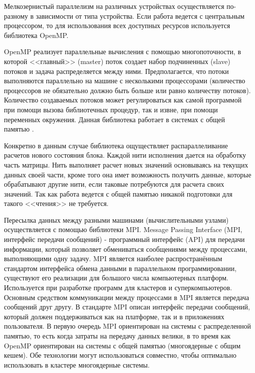 \documentclass[a4paper, 14pt]{article}
\theoremstyle{definition}
\begin{document}
\par Мелкозернистый параллелизм на различных устройствах осуществляется по-разному в зависимости от типа устройства. Если работа ведется с центральным процессором, то для использования всех доступных ресурсов используется библиотека OpenMP.

\par OpenMP реализует параллельные вычисления с помощью многопоточности, в которой <<главный>> (master) поток создает набор подчиненных (slave) потоков и задача распределяется между ними. Предполагается, что потоки выполняются параллельно на машине с несколькими процессорами (количество процессоров не обязательно должно быть больше или равно количеству потоков). Количество создаваемых потоков может регулироваться как самой программой при помощи вызова библиотечных процедур, так и извне, при помощи переменных окружения. Данная библиотека работает в системах с общей памятью .

\par Конкретно в данным случае библиотека ощуществляет распараллеливание расчетов нового состояния блока. Каждой нити исполнения дается на обработку часть матрицы. Нить выполняет расчет новых значений основываясь на текущих данных своей части, кроме того она имет возможность получить данные, которые обрабатывают другие нити, если таковые потребуются для расчета своих значений. Так как работа ведется с общей памятью никакой подготовки для такого <<чтения>> не требуется.

\par Пересылка данных между разными машинами (вычислительными узлами) осуществляется с помощью библиотеки MPI. Message Passing Interface (MPI, интерфейс передачи сообщений) - программный интерфейс (API) для передачи информации, который позволяет обмениваться сообщениями между процессами, выполняющими одну задачу. MPI является наиболее распространённым стандартом интерфейса обмена данными в параллельном программировании, существуют его реализации для большого числа компьютерных платформ. Используется при разработке программ для кластеров и суперкомпьютеров. Основным средством коммуникации между процессами в MPI является передача сообщений друг другу. В стандарте MPI описан интерфейс передачи сообщений, который должен поддерживаться как на платформе, так и в приложениях пользователя. В первую очередь MPI ориентирован на системы с распределенной памятью, то есть когда затраты на передачу данных велики, в то время как OpenMP ориентирован на системы с общей памятью (многоядерные с общим кешем). Обе технологии могут использоваться совместно, чтобы оптимально использовать в кластере многоядерные системы.
\end{document}
